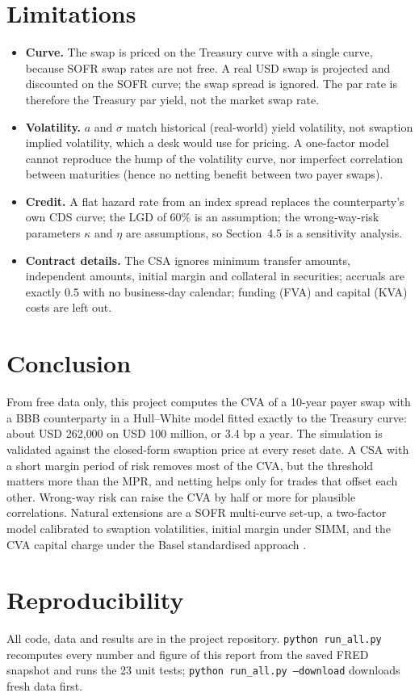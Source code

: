 \documentclass[11pt,a4paper]{article}
\begin{document}
\section{Limitations}
\label{sec:limits}

\begin{itemize}
  \item \textbf{Curve.} The swap is priced on the Treasury curve with a single curve, because SOFR swap rates are not free. A real USD swap is projected and discounted on the SOFR curve; the swap spread is ignored. The par rate is therefore the Treasury par yield, not the market swap rate.
  \item \textbf{Volatility.} $a$ and $\sigma$ match historical (real-world) yield volatility, not swaption implied volatility, which a desk would use for pricing. A one-factor model cannot reproduce the hump of the volatility curve, nor imperfect correlation between maturities (hence no netting benefit between two payer swaps).
  \item \textbf{Credit.} A flat hazard rate from an index spread replaces the counterparty's own CDS curve; the LGD of 60\% is an assumption; the wrong-way-risk parameters $\kappa$ and $\eta$ are assumptions, so Section~4.5 is a sensitivity analysis.
  \item \textbf{Contract details.} The CSA ignores minimum transfer amounts, independent amounts, initial margin and collateral in securities; accruals are exactly 0.5 with no business-day calendar; funding (FVA) and capital (KVA) costs are left out.
\end{itemize}

\section{Conclusion}

From free data only, this project computes the CVA of a 10-year payer swap with a BBB counterparty in a Hull--White model fitted exactly to the Treasury curve: about USD 262{,}000 on USD 100 million, or 3.4 bp a year. The simulation is validated against the closed-form swaption price at every reset date. A CSA with a short margin period of risk removes most of the CVA, but the threshold matters more than the MPR, and netting helps only for trades that offset each other. Wrong-way risk can raise the CVA by half or more for plausible correlations. Natural extensions are a SOFR multi-curve set-up, a two-factor model calibrated to swaption volatilities, initial margin under SIMM, and the CVA capital charge under the Basel standardised approach \citep{basel2014,basel2017}.




\section*{Reproducibility}
All code, data and results are in the project repository. \texttt{python run\_all.py} recomputes every number and figure of this report from the saved FRED snapshot and runs the 23 unit tests; \texttt{python run\_all.py --download} downloads fresh data first.
\end{document}
